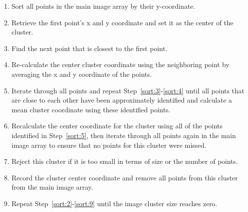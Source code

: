 \begin{enumerate}
\item \label{sort:1} Sort all points in the main image array by their y-coordinate.
\item \label{sort:2} Retrieve the first point's x and y coordinate and set it as the center of the cluster.
\item \label{sort:3} Find the next point that is closest to the first point.
\item \label{sort:4} Re-calculate the center cluster coordinate using the neighboring point by averaging the x and y coordinate of the points.
\item \label{sort:5} Iterate through all points and repeat Step~\ref{sort:3}-\ref{sort:4} until all points that are close to each other have been approximately identified and calculate a mean cluster coordinate using these identified points.
\item \label{sort:6} Recalculate the center coordinate for the cluster using all of the points identified in Step~\ref{sort:5}, then iterate through all points again in the main image array to ensure that no points for this cluster were missed.
\item \label{sort:8} Reject this cluster if it is too small in terms of size or the number of points.
\item \label{sort:9} Record the cluster center coordinate and remove all points from this cluster from the main image array.
\item \label{sort:10} Repeat Step~\ref{sort:2}-\ref{sort:9} until the image cluster size reaches zero.
\end{enumerate}

